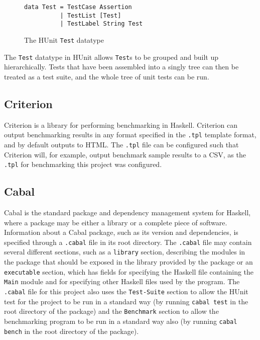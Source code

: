 \documentclass[12pt,a4paper,twoside,openright]{report}
\begin{document}
\begin{figure}[h]
\centering
\begin{verbatim}
data Test = TestCase Assertion
          | TestList [Test]
          | TestLabel String Test
\end{verbatim}
\caption{The HUnit {\tt Test} datatype}
\end{figure}

The \verb,Test, datatype in HUnit allows \verb,Test,s to be grouped
and built up hierarchically. Tests that have been assembled into a
singly tree can then be treated as a test suite, and the whole tree
of unit tests can be run.

\subsection{Criterion}

Criterion is a library for performing benchmarking in Haskell.
Criterion can output benchmarking results in any format specified in the \verb,.tpl,
template format, and by default outputs to HTML.
The \verb,.tpl, file can be configured such that
Criterion will, for example, output benchmark sample results to a CSV, as the
\verb,.tpl, for benchmarking this project was configured.

\subsection{Cabal}

Cabal is the standard package and dependency management system for Haskell,
where a package may be either a library or a complete piece of software.
Information about a Cabal package, such as its version and dependencies,
is specified through a \verb,.cabal, file in its root directory.
The \verb,.cabal, file may contain several different sections, such as a
\verb,library, section, describing the modules in the package that should be
exposed in the library provided by the package or an \verb,executable, section,
which has fields for specifying the Haskell file containing the \verb,Main,
module and for specifying other Haskell files used by the program.
The \verb,.cabal, file for this project also uses the \verb,Test-Suite, section
to allow the HUnit test for the project to be run in a standard way (by running
\verb,cabal test, in the root directory of the package) and the \verb,Benchmark,
section to allow the benchmarking program to be run in a standard way also
(by running \verb,cabal bench, in the root directory of the package).
\end{document}
